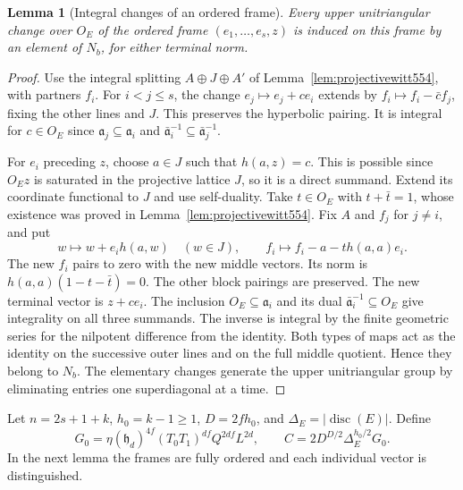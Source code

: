 \documentclass[a4paper,11pt]{article}
\newtheorem{lemma}[proposition]{Lemma}
\theoremstyle{definition}
\theoremstyle{remark}
\numberwithin{equation}{section}
\begin{document}
\begin{lemma}[Integral changes of an ordered frame]
\leavevmode\label{lem:framelifts591}
Every upper unitriangular change over \(O_E\) of the ordered
frame \((e_1,\ldots,e_s,z)\) is induced on this frame by an
element of \(N_b\), for either terminal norm.
\end{lemma}
\begin{proof}
Use the integral splitting \(A\oplus J\oplus A'\) of
Lemma~\ref{lem:projectivewitt554}, with partners \(f_i\).
For \(i<j\le s\), the change \(e_j\mapsto e_j+c e_i\)
extends by \(f_i\mapsto f_i-\bar c f_j\), fixing the other
lines and \(J\). This preserves the hyperbolic pairing.
It is integral for \(c\in O_E\) since
\(\mathfrak a_j\subseteq\mathfrak a_i\) and
\(\bar{\mathfrak a}_i^{-1}\subseteq\bar{\mathfrak a}_j^{-1}\).

For \(e_i\) preceding \(z\), choose \(a\in J\) such that
\(h(a,z)=c\). This is possible since \(O_Ez\) is saturated
in the projective lattice \(J\), so it is a direct summand.
Extend its coordinate functional to \(J\) and use
self-duality. Take \(t\in O_E\) with \(t+\bar t=1\),
whose existence was proved in Lemma~\ref{lem:projectivewitt554}.
Fix \(A\) and \(f_j\) for \(j\ne i\), and put
\[
 w\longmapsto w+e_i h(a,w)\quad(w\in J),\qquad
 f_i\longmapsto f_i-a-t h(a,a)e_i .
\]
The new \(f_i\) pairs to zero with the new middle vectors.
Its norm is \(h(a,a)(1-t-\bar t)=0\). The other block
pairings are preserved. The new terminal vector is
\(z+c e_i\). The inclusion \(O_E\subseteq\mathfrak a_i\)
and its dual \(\bar{\mathfrak a}_i^{-1}\subseteq O_E\)
give integrality on all three summands. The inverse is
integral by the finite geometric series for the nilpotent
difference from the identity. Both types of maps act as the
identity on the successive outer lines and on the full
middle quotient. Hence they belong to \(N_b\). The elementary
changes generate the upper unitriangular group by eliminating
entries one superdiagonal at a time.
\end{proof}

Let \(n=2s+1+k\), \(h_0=k-1\ge1\), \(D=2fh_0\), and
\(\Delta_E=|\operatorname{disc}(E)|\). Define
\[
 G_0=\eta(\mathfrak h_d)^{4f}(T_0T_1)^{df}
                         Q^{2df}L^{2d},\qquad
 C=2D^{D/2}\Delta_E^{h_0/2}G_0 .
\]
In the next lemma the frames are fully ordered and each
individual vector is distinguished.
\end{document}
